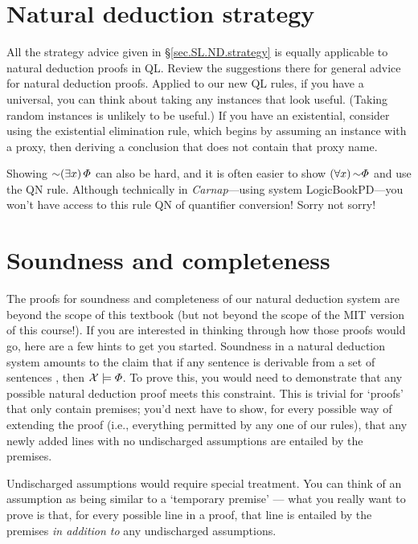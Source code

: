 \section{Natural deduction strategy}

All the strategy advice given in \S\ref{sec.SL.ND.strategy} is equally applicable to natural deduction proofs in QL. Review the suggestions there for general advice for natural deduction proofs. Applied to our new QL rules, if you have a universal, you can think about taking any instances that look useful. (Taking random instances is unlikely to be useful.) If you have an existential, consider using the existential elimination rule, which begins by assuming an instance with a proxy, then deriving a conclusion that does not contain that proxy name.

Showing $\enot \qt{\exists}{x}\metaA{}$ can also be hard, and it is often easier to show  $\qt{\forall}{x}\enot \metaA{}$ and use the QN rule. {\color{black} Although technically in \textit{Carnap}---using system LogicBookPD---you won't have access to this rule QN of quantifier conversion! Sorry not sorry!} 



\section{Soundness and completeness}

The proofs for soundness and completeness of our natural deduction system are beyond the scope of this textbook {\color{black} (but not beyond the scope of the MIT version of this course!)}. If you are interested in thinking through how those proofs would go, here are a few hints to get you started. Soundness in a natural deduction system amounts to the claim that if any sentence \metaA{} is derivable from a set of sentences \metaSetX{}, then $\mathcal{X}{}\models\varPhi{}$. To prove this, you would need to demonstrate that any possible natural deduction proof meets this constraint. This is trivial for `proofs' that only contain premises; you'd next have to show, for every possible way of extending the proof (i.e., everything permitted by any one of our rules), that any newly added lines with no undischarged assumptions are entailed by the premises.

Undischarged assumptions would require special treatment. You can think of an assumption as being similar to a `temporary premise' --- what you really want to prove is that, for every possible line in a proof, that line is entailed by the premises \emph{in addition to} any undischarged assumptions.

